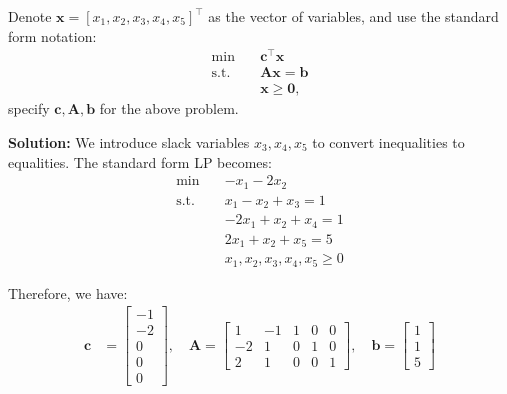 \documentclass[11pt]{article}
\newcommand{\mb}[1]{\ensuremath{\boldsymbol{#1}}}
\begin{document}
\begin{enumerate}
\begin{enumerate}
		Denote $\mb{x}=[x_1,x_2,x_3,x_4,x_5]^\top$ as the vector of variables, and use the standard form notation: 
		\begin{align*}
		\min \quad & \mb{c}^\top\mb{x} \\
		\text{s.t.}\quad & \mb{A}\mb{x} = \mb{b} \\
		& \mb{x}\geq \mb{0},
		\end{align*}
		specify $\mb{c},\mb{A},\mb{b}$ for the above problem.
		
		\textbf{Solution:}
		We introduce slack variables $x_3, x_4, x_5$ to convert inequalities to equalities. The standard form LP becomes:
		\begin{align*}
		\min \quad & -x_1 - 2x_2 \\
		\text{s.t.}\quad & x_1 - x_2 + x_3 = 1 \\
		& -2x_1 + x_2 + x_4 = 1 \\
		& 2x_1 + x_2 + x_5 = 5 \\
		& x_1, x_2, x_3, x_4, x_5 \geq 0
		\end{align*}
		
		Therefore, we have:
		\begin{align*}
		\mb{c} &= \begin{bmatrix} -1 \\ -2 \\ 0 \\ 0 \\ 0 \end{bmatrix}, \quad
		\mb{A} = \begin{bmatrix} 
		1 & -1 & 1 & 0 & 0 \\
		-2 & 1 & 0 & 1 & 0 \\
		2 & 1 & 0 & 0 & 1
		\end{bmatrix}, \quad
		\mb{b} = \begin{bmatrix} 1 \\ 1 \\ 5 \end{bmatrix}
		\end{align*}
		

\end{enumerate}
\end{enumerate}
\end{document}
